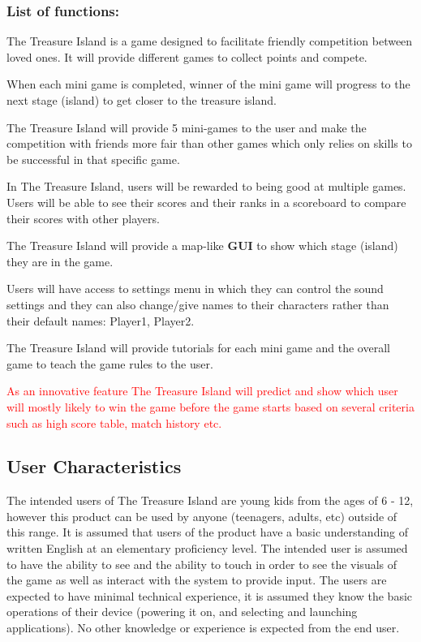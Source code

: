 \documentclass[]{article}
\begin{document}
\subsubsection{List of functions:}
\begin{enumerate}[a)]
\item The Treasure Island is a game designed to facilitate friendly competition between loved ones. It will provide different games to collect points and compete.
\item When each mini game is completed, winner of the mini game will progress to the next stage (island) to get closer to the treasure island.
\item The Treasure Island will provide 5 mini-games to the user and make the competition with friends more fair than other games which only relies on skills to be successful in that specific game.
\item In The Treasure Island, users will be rewarded to being good at multiple games.
Users will be able to see their scores and their ranks in a scoreboard to compare their scores with other players.
\item The Treasure Island will provide a map-like \textbf{GUI} to show which stage (island) they are in the game.
\item Users will have access to settings menu in which they can control the sound settings and they can also change/give names to their characters rather than their default names: Player1, Player2.
\item The Treasure Island will provide tutorials for each mini game and the overall game to teach the game rules to the user.
\textcolor{red}{
\item As an innovative feature The Treasure Island will predict and show which user will mostly likely to win the game before the game starts based on several criteria such as high score table, match history etc.
}
\end{enumerate}



\subsection{User Characteristics}
\label{sub:user_characteristics}
The intended users of The Treasure Island are young kids from the ages of 6 - 12, however this product can be used by anyone (teenagers, adults, etc) outside of this range. It is assumed that users of the product have a basic understanding of written English at an elementary proficiency level. The intended user is assumed to have the ability to see and the ability to touch in order to see the visuals of the game as well as interact with the system to provide input. The users are expected to have minimal technical experience, it is assumed they know the basic operations of their device (powering it on, and selecting and launching applications). No other knowledge or experience is expected from the end user.
\end{document}

